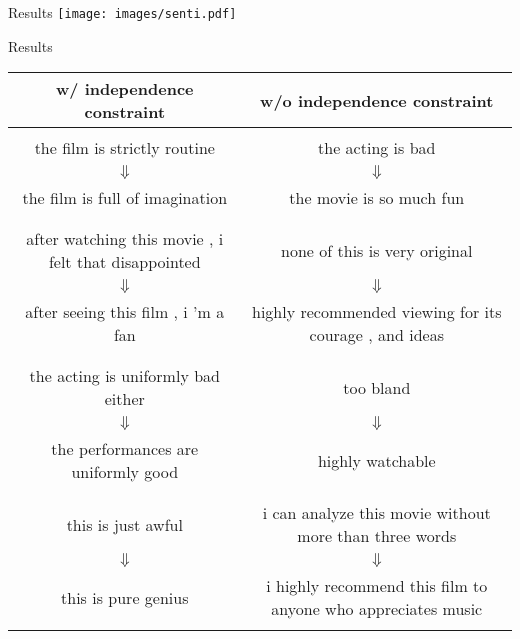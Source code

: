 \documentclass{beamer}
\begin{document}
\begin{frame}{Results}
  \centering
  \texttt{[image: images/senti.pdf]}
\end{frame}

\begin{frame}{Results}  
  \begin{table}
    \tiny
    \centering
    \begin{tabular}{ c || c }
    \centering
    {\small \textbf{w/ independence constraint}} & {\small\textbf{w/o independence constraint}} \\ \hline       \hline \\
      the film is strictly routine & the acting is bad \\
      $\Downarrow$ & $\Downarrow$ \\
      the film is full of imagination & the movie is so much fun \\ \\
      \hline \\
      after watching this movie , i felt that disappointed & none of this is very original \\ 
      $\Downarrow$ & $\Downarrow$ \\
      after seeing this film , i 'm a fan & highly recommended viewing for its courage , and ideas\\ \\
      \hline \\
      the acting is uniformly bad either &  too bland \\
      $\Downarrow$ & $\Downarrow$ \\
      the performances are uniformly good & highly watchable \\ \\
      \hline \\
      this is just awful & i can analyze this movie without more than three words \\ 
      $\Downarrow$ & $\Downarrow$ \\
      this is pure genius & i highly recommend this film to anyone who appreciates music   \\ \\
    \end{tabular}    
  \end{table}
\end{frame}

{\tiny }
\end{document}
